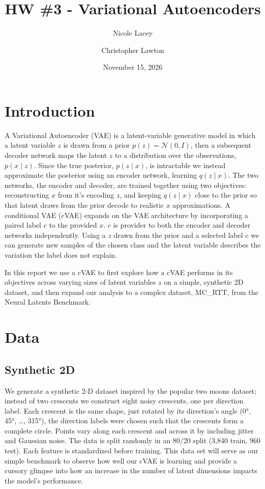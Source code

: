 \documentclass[10pt]{article}
\title{HW \#3 - Variational Autoencoders}
\author{Nicole Lacey \and Christopher Lawton}
\date{November 15, 2026}
\begin{document}
\maketitle

\section{Introduction}

A Variational Autoencoder (VAE) is a latent-variable generative model in which a latent variable $z$ is drawn from a prior $p(z) = \mathcal{N}(0, I)$, then a subsequent decoder network maps the latent $z$ to a distribution over the observations, $p(x \mid z)$.
Since the true posterior, $p(z \mid x)$, is intractable we instead approximate the posterior using an encoder network, learning $q(z \mid x)$.
The two networks, the encoder and decoder, are trained together using two objectives: reconstructing $x$ from it's encoding $z$, and keeping $q(z \mid x)$ close to the prior so that latent draws from the prior decode to realistic $x$ approximations.
A conditional VAE (cVAE) expands on the VAE architecture by incorporating a paired label $c$ to the provided $x$.
$c$ is provider to both the encoder and decoder networks independently.
Using a $z$ drawn from the prior and a selected label $c$ we can generate new samples of the chosen class and the latent variable describes the variation the label does not explain.

In this report we use a cVAE to first explore how a cVAE performs in its objectives across varying sizes of latent variables $z$ on a simple, synthetic 2D dataset, and then expand our analysis to a complex dataset, MC\_RTT, from the Neural Latents Benchmark.

\section{Data}

\subsection{Synthetic 2D}

We generate a synthetic 2-D dataset inspired by the popular two moons dataset; instead of two crescents we construct eight noisy crescents, one per direction label.
Each crescent is the same shape, just rotated by its direction's angle (0°, 45°, …, 315°), the direction labels were chosen such that the crescents form a complete circle.
Points vary along each crescent and across it by including jitter and Gaussian noise.
The data is split randomly in an 80/20 split (3,840 train, 960 test).
Each feature is standardized before training.
This data set will serve as our simple benchmark to observe how well our cVAE is learning and provide a cursory glimpse into how an increase in the number of latent dimensions impacts the model's performance.
\end{document}
